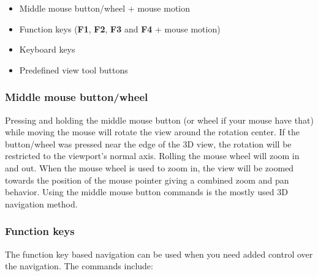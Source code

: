 \begin{itemize}
\item Middle mouse button/wheel + mouse motion
\item Function keys (\textbf{F1}, \textbf{F2}, \textbf{F3}
  and \textbf{F4} + mouse motion)
\item Keyboard keys
\item Predefined view tool buttons
\end{itemize}

\subsubsection{Middle mouse button/wheel}

Pressing and holding the middle mouse button (or wheel if your mouse have that)
while moving the mouse will rotate the view around the rotation center.
If the button/wheel was pressed near the edge of the 3D view, the rotation will
be restricted to the viewport’s normal axis.
Rolling the mouse wheel will zoom in and out. When the mouse wheel is used to
zoom in, the view will be zoomed towards the position of the mouse pointer
giving a combined zoom and pan behavior.
Using the middle mouse button commands is the mostly used 3D navigation method.

\subsubsection{Function keys}

The function key based navigation can be used when you need added control
over the navigation. The commands include:

